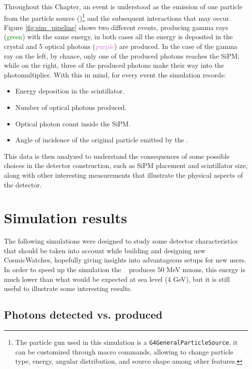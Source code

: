 Throughout this Chapter, an event is understood as the emission of one particle from the particle source (\gps)\footnote{The particle gun used in this simulation is a \texttt{G4GeneralParticleSource}, it can be customized through macro commands, allowing to change particle type, energy, angular distribution, and source shape among other features.} and the subsequent interactions that may occur. Figure \ref{fig:sim_pipeline} shows two different events, producing gamma rays (\textcolor{green}{green}) with the same energy, in both cases all the energy is deposited in the crystal and 5 optical photons (\textcolor{Orchid}{purple}) are produced. In the case of the gamma ray on the left, by chance, only one of the produced photons reaches the SiPM; while on the right, three of the produced photons make their way into the photomultiplier. With this in mind, for every event the simulation records:
\begin{itemize}
  \item Energy deposition in the scintillator.
  \item Number of optical photons produced.
  \item Optical photon count inside the SiPM.
  \item Angle of incidence of the original particle emitted by the \gps.
\end{itemize}

This data is then analyzed to understand the consequences of some possible choices in the detector construction, such as SiPM placement and scintillator size, along with other interesting measurements that illustrate the physical aspects of the detector.

\section{Simulation results}

The following simulations were designed to study some detector characteristics that should be taken into account while building and designing new CosmicWatches, hopefully giving insights into advantageous setups for new users. In order to speed up the simulation the \gps~ produces 50 \unit{\mega\eV} muons, this energy is much lower than what would be expected at sea level (4 \unit{\giga\eV}), but it is still useful to illustrate some interesting results.

\subsection{Photons detected vs. produced}\label{sec:collected_produced}

